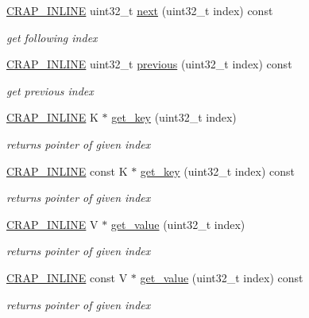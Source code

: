 \begin{DoxyCompactItemize}
\hyperlink{config__x86_8h_a5a40526b8d842e7ff731509998bb0f1c}{C\+R\+A\+P\+\_\+\+I\+N\+L\+I\+N\+E} uint32\+\_\+t \hyperlink{classcrap_1_1tree__map_a051007118a7093cae6c8f01e454fbe85}{next} (uint32\+\_\+t index) const 
\begin{DoxyCompactList}\small\item\em get following index \end{DoxyCompactList}\item 
\hyperlink{config__x86_8h_a5a40526b8d842e7ff731509998bb0f1c}{C\+R\+A\+P\+\_\+\+I\+N\+L\+I\+N\+E} uint32\+\_\+t \hyperlink{classcrap_1_1tree__map_a5abad3c74353a3ffd5809a5ad90a5043}{previous} (uint32\+\_\+t index) const 
\begin{DoxyCompactList}\small\item\em get previous index \end{DoxyCompactList}\item 
\hyperlink{config__x86_8h_a5a40526b8d842e7ff731509998bb0f1c}{C\+R\+A\+P\+\_\+\+I\+N\+L\+I\+N\+E} K $\ast$ \hyperlink{classcrap_1_1tree__map_a769dfe2def3e2f7afec379330a5dccd5}{get\+\_\+key} (uint32\+\_\+t index)
\begin{DoxyCompactList}\small\item\em returns pointer of given index \end{DoxyCompactList}\item 
\hyperlink{config__x86_8h_a5a40526b8d842e7ff731509998bb0f1c}{C\+R\+A\+P\+\_\+\+I\+N\+L\+I\+N\+E} const K $\ast$ \hyperlink{classcrap_1_1tree__map_adc132a76869010965935305174c18969}{get\+\_\+key} (uint32\+\_\+t index) const 
\begin{DoxyCompactList}\small\item\em returns pointer of given index \end{DoxyCompactList}\item 
\hyperlink{config__x86_8h_a5a40526b8d842e7ff731509998bb0f1c}{C\+R\+A\+P\+\_\+\+I\+N\+L\+I\+N\+E} V $\ast$ \hyperlink{classcrap_1_1tree__map_ae7e9ee14f25b0f6eff1c873ecee23a42}{get\+\_\+value} (uint32\+\_\+t index)
\begin{DoxyCompactList}\small\item\em returns pointer of given index \end{DoxyCompactList}\item 
\hyperlink{config__x86_8h_a5a40526b8d842e7ff731509998bb0f1c}{C\+R\+A\+P\+\_\+\+I\+N\+L\+I\+N\+E} const V $\ast$ \hyperlink{classcrap_1_1tree__map_a9d76484289e78739fe2f171af0a6b8af}{get\+\_\+value} (uint32\+\_\+t index) const 
\begin{DoxyCompactList}\small\item\em returns pointer of given index \end{DoxyCompactList}\item 

\end{DoxyCompactItemize}
